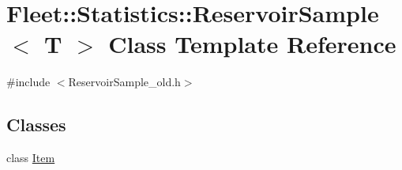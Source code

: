 \hypertarget{class_fleet_1_1_statistics_1_1_reservoir_sample}{}\section{Fleet\+:\+:Statistics\+:\+:Reservoir\+Sample$<$ T $>$ Class Template Reference}
\label{class_fleet_1_1_statistics_1_1_reservoir_sample}


{\ttfamily \#include $<$Reservoir\+Sample\+\_\+old.\+h$>$}

\subsection*{Classes}
\begin{DoxyCompactItemize}
\item 
class \hyperlink{class_fleet_1_1_statistics_1_1_reservoir_sample_1_1_item}{Item}
\end{DoxyCompactItemize}
